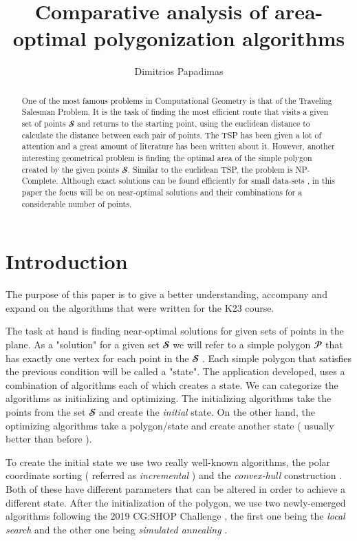 \documentclass[12pt]{article}
\title{Comparative analysis of area-optimal polygonization algorithms}
\author{Dimitrios Papadimas\inst{1}}
\begin{document}
 
	
	\maketitle
	
	\begin{abstract}
		One of the most famous problems in Computational Geometry is that of the Traveling Salesman Problem. It is the task of finding the most efficient route that visits a given set of points $\mathbfcal{S}$ and returns to the starting point, using the euclidean distance to calculate the distance between each pair of points. The TSP has been given a lot of attention and a great amount of literature has been written about it. However, another interesting geometrical problem is finding the optimal area of the simple polygon created by the given points $\mathbfcal{S}$. Similar to the euclidean TSP, the problem is NP-Complete. Although exact solutions can be found efficiently for small data-sets , in this paper the focus will be on near-optimal solutions and their combinations for a considerable number of points.
	\end{abstract}
	
	\section{Introduction}
	\label{sec:Introduction}

    The purpose of this paper is to give a better understanding, accompany and expand on the algorithms that were written for the K23 course.
    
    The task at hand is finding near-optimal solutions for given sets of points in the plane. As a "solution" for a given set $\mathbfcal{S}$ we will refer to a simple polygon $\mathbfcal{P}$ that has exactly one vertex for each point in the $\mathbfcal{S}$ . Each simple polygon that satisfies the previous condition will be called a "state". The application developed, uses a combination of algorithms each of which creates a state. We can categorize the algorithms as initializing and optimizing. The initializing algorithms take the points from the set $\mathbfcal{S}$ and create the \textit{initial} state. On the other hand, the optimizing algorithms take a polygon/state and create another state ( usually better than before ). 

    To create the initial state we use two really well-known algorithms, the polar coordinate sorting \citep{163408} ( referred as \emph{incremental} ) and the \emph{convex-hull} construction \citep{6004091}. Both of these have different parameters that can be altered in order to achieve a different state. After the initialization of the polygon, we use two newly-emerged algorithms following the 2019 CG:SHOP Challenge \citep{demaine2022area}, the first one being the \emph{local search} \citep{crombez2022greedy} and the other one being \emph{simulated annealing} \citep{goren2022area}. 
\end{document}
